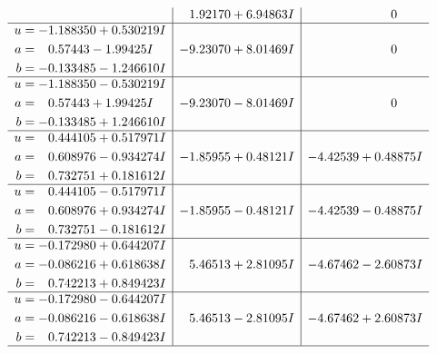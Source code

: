 \documentclass[1p]{elsarticle_modified}
\theoremstyle{definition}
\begin{document}
$$\begin{array}{c|c|c}
 & \phantom{-}1.92170 + 6.94863 I & \phantom{-0.000000 } 0 \\ \hline\begin{aligned}
u &= -1.188350 + 0.530219 I \\
a &= \phantom{-}0.57443 - 1.99425 I \\
b &= -0.133485 - 1.246610 I\end{aligned}
 & -9.23070 + 8.01469 I & \phantom{-0.000000 } 0 \\ \hline\begin{aligned}
u &= -1.188350 - 0.530219 I \\
a &= \phantom{-}0.57443 + 1.99425 I \\
b &= -0.133485 + 1.246610 I\end{aligned}
 & -9.23070 - 8.01469 I & \phantom{-0.000000 } 0 \\ \hline\begin{aligned}
u &= \phantom{-}0.444105 + 0.517971 I \\
a &= \phantom{-}0.608976 - 0.934274 I \\
b &= \phantom{-}0.732751 + 0.181612 I\end{aligned}
 & -1.85955 + 0.48121 I & -4.42539 + 0.48875 I \\ \hline\begin{aligned}
u &= \phantom{-}0.444105 - 0.517971 I \\
a &= \phantom{-}0.608976 + 0.934274 I \\
b &= \phantom{-}0.732751 - 0.181612 I\end{aligned}
 & -1.85955 - 0.48121 I & -4.42539 - 0.48875 I \\ \hline\begin{aligned}
u &= -0.172980 + 0.644207 I \\
a &= -0.086216 + 0.618638 I \\
b &= \phantom{-}0.742213 + 0.849423 I\end{aligned}
 & \phantom{-}5.46513 + 2.81095 I & -4.67462 - 2.60873 I \\ \hline\begin{aligned}
u &= -0.172980 - 0.644207 I \\
a &= -0.086216 - 0.618638 I \\
b &= \phantom{-}0.742213 - 0.849423 I\end{aligned}
 & \phantom{-}5.46513 - 2.81095 I & -4.67462 + 2.60873 I\\
 \hline 
 \end{array}$$\newpage$$\begin{array}{c|c|c}  

\end{array}$$
\end{document}
